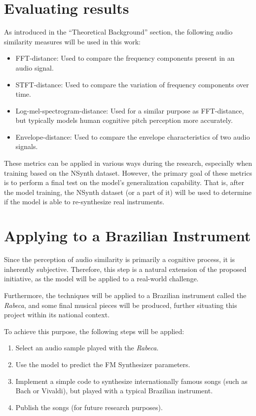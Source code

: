 \documentclass[sigconf,natbib=false]{acmart}
\begin{document}
\section{Evaluating results}

As introduced in the ``Theoretical Background'' section, the following audio similarity measures will be used in this work:

\begin{itemize}
\item FFT-distance: Used to compare the frequency components present in an audio signal.
\item STFT-distance: Used to compare the variation of frequency components over time.
\item Log-mel-spectrogram-distance: Used for a similar purpose as FFT-distance, but typically models human cognitive pitch perception more accurately.
\item Envelope-distance: Used to compare the envelope characteristics of two audio signals.
\end{itemize}

These metrics can be applied in various ways during the research, especially when training based on the NSynth dataset. However, the primary goal of these metrics is to perform a final test on the model's generalization capability. That is, after the model training, the NSynth dataset (or a part of it) will be used to determine if the model is able to re-synthesize real instruments.

\section{Applying to a Brazilian Instrument}

Since the perception of audio similarity is primarily a cognitive process, it is inherently subjective. Therefore, this step is a natural extension of the proposed initiative, as the model will be applied to a real-world challenge.

Furthermore, the techniques will be applied to a Brazilian instrument called the \textit{Rabeca}, and some final musical pieces will be produced, further situating this project within its national context.

To achieve this purpose, the following steps will be applied:

\begin{enumerate}
    \item Select an audio sample played with the \textit{Rabeca}.
    \item Use the model to predict the FM Synthesizer parameters.
    \item Implement a simple code to synthesize internationally famous songs (such as Bach or Vivaldi), but played with a typical Brazilian instrument.
    \item Publish the songs (for future research purposes).
\end{enumerate}
\end{document}
